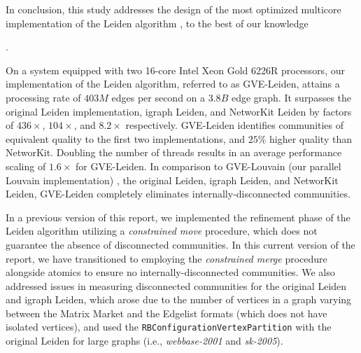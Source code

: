 In conclusion, this study addresses the design of the most optimized multicore implementation of the Leiden algorithm \cite{com-traag19}, to the best of our knowledge. On a system equipped with two 16-core Intel Xeon Gold 6226R processors, our implementation of the Leiden algorithm, referred to as GVE-Leiden, attains a processing rate of $403 M$ edges per second on a $3.8 B$ edge graph. It surpasses the original Leiden implementation, igraph Leiden, and NetworKit Leiden by factors of $436\times$, $104\times$, and $8.2\times$ respectively. GVE-Leiden identifies communities of equivalent quality to the first two implementations, and $25\%$ higher quality than NetworKit. Doubling the number of threads results in an average performance scaling of $1.6\times$ for GVE-Leiden. In comparison to GVE-Louvain (our parallel Louvain implementation) \cite{sahu2023gvelouvain}, the original Leiden, igraph Leiden, and NetworKit Leiden, GVE-Leiden completely eliminates internally-disconnected communities.

In a previous version of this report, we implemented the refinement phase of the Leiden algorithm utilizing a \textit{constrained move} procedure, which does not guarantee the absence of disconnected communities. In this current version of the report, we have transitioned to employing the \textit{constrained merge} procedure alongside atomics to ensure no internally-disconnected communities. We also addressed issues in measuring disconnected communities for the original Leiden and igraph Leiden, which arose due to the number of vertices in a graph varying between the Matrix Market and the Edgelist formats (which does not have isolated vertices), and used the \texttt{RBConfigurationVertexPartition} with the original Leiden for large graphs (i.e., \textit{webbase-2001} and \textit{sk-2005}).
